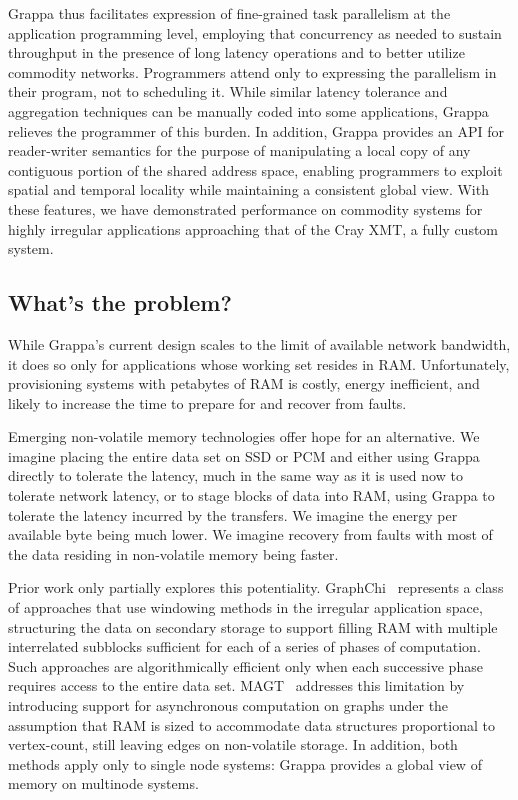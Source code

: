 Grappa thus facilitates
expression of fine-grained task parallelism at the application
programming level, employing that concurrency as needed to sustain throughput in the presence of long latency operations and to better utilize commodity networks.  Programmers attend only to expressing the parallelism in their program, not to scheduling it.  While similar latency
tolerance and aggregation techniques can be manually coded into some
applications, Grappa relieves the programmer of this burden.  In
addition, Grappa provides an API for reader-writer semantics for the
purpose of manipulating a local copy of any contiguous portion of the
shared address space, enabling programmers to exploit spatial and
temporal locality while maintaining a consistent global view.  With
these features, we have demonstrated performance on commodity systems
for highly irregular applications approaching that of the Cray XMT, a
fully custom system.

\subsection{What's the problem?}

While Grappa's current design scales to the limit of available network
bandwidth, it does so only for applications whose working set resides
in RAM.  Unfortunately, provisioning systems with petabytes of RAM is
costly, energy inefficient, and likely to increase the time to prepare
for and recover from faults.

Emerging non-volatile memory technologies offer hope for an
alternative.  We imagine placing the entire data set on SSD or PCM and
either using Grappa directly to tolerate the latency, much in the same
way as it is used now to tolerate network latency, or to stage blocks
of data into RAM, using Grappa to tolerate the latency incurred by the
transfers.  We imagine the energy per available byte being much lower.
We imagine recovery from faults with most of the data residing in
non-volatile memory being faster.

Prior work only partially explores this potentiality. GraphChi~\cite{graphchi:osdi12}
represents a class of approaches that use windowing methods in the
irregular application space, structuring the data on secondary storage
to support filling RAM with multiple interrelated subblocks sufficient
for each of a series of phases of computation.  Such approaches are
algorithmically efficient only when each successive phase requires
access to the entire data set.  MAGT~\cite{magt:2010} addresses this limitation by
introducing support for asynchronous computation on graphs under the
assumption that RAM is sized to accommodate data structures
proportional to vertex-count, still leaving edges on non-volatile
storage.  In addition, both methods apply only to single node systems:
Grappa provides a global view of memory on multinode systems.

